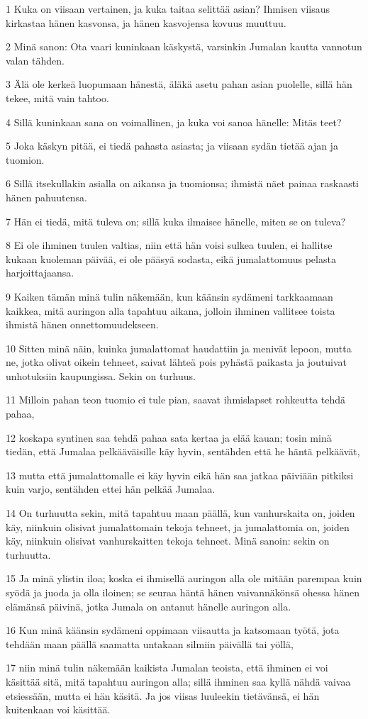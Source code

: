 \par 1 Kuka on viisaan vertainen, ja kuka taitaa selittää asian? Ihmisen viisaus kirkastaa hänen kasvonsa, ja hänen kasvojensa kovuus muuttuu.
\par 2 Minä sanon: Ota vaari kuninkaan käskystä, varsinkin Jumalan kautta vannotun valan tähden.
\par 3 Älä ole kerkeä luopumaan hänestä, äläkä asetu pahan asian puolelle, sillä hän tekee, mitä vain tahtoo.
\par 4 Sillä kuninkaan sana on voimallinen, ja kuka voi sanoa hänelle: Mitäs teet?
\par 5 Joka käskyn pitää, ei tiedä pahasta asiasta; ja viisaan sydän tietää ajan ja tuomion.
\par 6 Sillä itsekullakin asialla on aikansa ja tuomionsa; ihmistä näet painaa raskaasti hänen pahuutensa.
\par 7 Hän ei tiedä, mitä tuleva on; sillä kuka ilmaisee hänelle, miten se on tuleva?
\par 8 Ei ole ihminen tuulen valtias, niin että hän voisi sulkea tuulen, ei hallitse kukaan kuoleman päivää, ei ole pääsyä sodasta, eikä jumalattomuus pelasta harjoittajaansa.
\par 9 Kaiken tämän minä tulin näkemään, kun käänsin sydämeni tarkkaamaan kaikkea, mitä auringon alla tapahtuu aikana, jolloin ihminen vallitsee toista ihmistä hänen onnettomuudekseen.
\par 10 Sitten minä näin, kuinka jumalattomat haudattiin ja menivät lepoon, mutta ne, jotka olivat oikein tehneet, saivat lähteä pois pyhästä paikasta ja joutuivat unhotuksiin kaupungissa. Sekin on turhuus.
\par 11 Milloin pahan teon tuomio ei tule pian, saavat ihmislapset rohkeutta tehdä pahaa,
\par 12 koskapa syntinen saa tehdä pahaa sata kertaa ja elää kauan; tosin minä tiedän, että Jumalaa pelkääväisille käy hyvin, sentähden että he häntä pelkäävät,
\par 13 mutta että jumalattomalle ei käy hyvin eikä hän saa jatkaa päiviään pitkiksi kuin varjo, sentähden ettei hän pelkää Jumalaa.
\par 14 On turhuutta sekin, mitä tapahtuu maan päällä, kun vanhurskaita on, joiden käy, niinkuin olisivat jumalattomain tekoja tehneet, ja jumalattomia on, joiden käy, niinkuin olisivat vanhurskaitten tekoja tehneet. Minä sanoin: sekin on turhuutta.
\par 15 Ja minä ylistin iloa; koska ei ihmisellä auringon alla ole mitään parempaa kuin syödä ja juoda ja olla iloinen; se seuraa häntä hänen vaivannäkönsä ohessa hänen elämänsä päivinä, jotka Jumala on antanut hänelle auringon alla.
\par 16 Kun minä käänsin sydämeni oppimaan viisautta ja katsomaan työtä, jota tehdään maan päällä saamatta untakaan silmiin päivällä tai yöllä,
\par 17 niin minä tulin näkemään kaikista Jumalan teoista, että ihminen ei voi käsittää sitä, mitä tapahtuu auringon alla; sillä ihminen saa kyllä nähdä vaivaa etsiessään, mutta ei hän käsitä. Ja jos viisas luuleekin tietävänsä, ei hän kuitenkaan voi käsittää.

